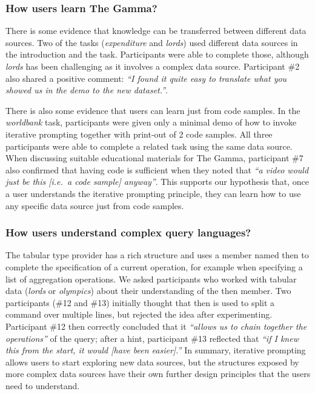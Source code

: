 \documentclass[manuscript,review,anonymous]{acmart}
\newcommand{\ikvd}[1]{{\fontfamily{zi4}\selectfont\small #1}}
\begin{document}
\subsubsection*{How users learn The Gamma?}
There is some evidence that knowledge can be transferred between different data sources. Two of the
tasks (\emph{expenditure} and \emph{lords}) used different data sources in the introduction and the
task. Participants were able to complete those, although \emph{lords} has been challenging as it
involves a complex data source. Participant \#2 also shared a positive comment:
\emph{``I found it quite easy to translate what you showed us in the demo to the new dataset.''}.

There is also some evidence that users can learn just from code samples. In the
\emph{worldbank} task, participants were given only a minimal demo of how to invoke iterative
prompting together with print-out of 2 code samples. All three participants were able to complete
a related task using the same data source. When discussing suitable educational materials for
The Gamma, participant \#7 also confirmed that having code is sufficient when they noted that
\emph{``a video would just be this [i.e.~a code sample] anyway''}. This supports our hypothesis
that, once a user understands the iterative prompting principle, they can learn how to use any
specific data source just from code samples.

\subsubsection*{How users understand complex query languages?}
The tabular type provider has a rich structure and uses a member named \ikvd{then} to complete
the specification of a current operation, for example when specifying a list of aggregation
operations. We asked participants who worked with tabular data (\emph{lords} or \emph{olympics})
about their understanding of the \ikvd{then} member. Two participants (\#12 and \#13) initially
thought that \ikvd{then} is used to split a command over multiple lines, but rejected the idea after
experimenting. Participant \#12 then correctly concluded that it \emph{``allows us
to chain together the operations''} of the query; after a hint, participant \#13 reflected
that \emph{``if I knew this from the start, it would [have been easier].''}
In summary, iterative prompting allows users to start exploring new data sources, but
the structures exposed by more complex data sources have their own further design principles that
the users need to understand.
\end{document}
